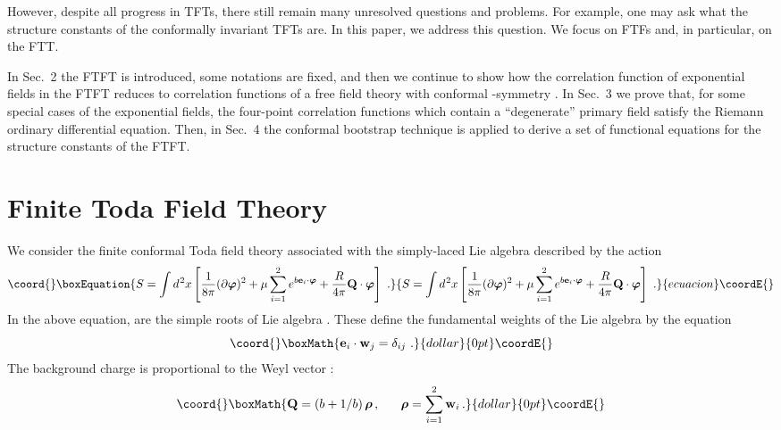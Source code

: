 \documentclass[a4paper,12pt]{article}
\providecommand{\bm}{\boldsymbol}
\begin{document}
However, despite all progress in TFTs, there still remain
many unresolved questions and problems. For example, one may ask
what the structure constants of the conformally invariant TFTs are.
In this paper, we address this question. We focus on FTFs and, in particular,
on the \coordHE{} FTT.

In Sec.~2 the
\coordHE{} FTFT is introduced, some notations are fixed, and then we
continue to show how the correlation function of exponential
fields in the FTFT reduces to correlation functions of a free
field theory with conformal \coordHE{}-symmetry \cite{Bilal,BS,FZ,LF}. 
In Sec.~3 we prove that, for some special cases of the
exponential fields, the four-point correlation functions which
contain  a ``degenerate'' primary field satisfy the Riemann
ordinary differential equation.
Then, in Sec.~4 the conformal bootstrap technique is applied to
derive a set of functional equations for the structure constants of the
\coordHE{} FTFT.

\section{\coordHE{} Finite Toda Field Theory}
We consider the finite conformal Toda field theory associated with
the simply-laced Lie algebra \coordHE{}  described by the action
\begin{equation}\coord{}\boxEquation{	
S=\int d^{\kern0.6pt 2}x
\left[\frac{1}{8\pi}(\partial{\bm\varphi})^2+\mu
\sum^2_{i=1} e^{b{\bf e}_i\cdot{\bm\varphi}}
+\frac{R}{4\pi}{\bf Q}\cdot{\bm\varphi}\right]~.
\label{eq:1}
}{	
S=\int d^{\kern0.6pt 2}x
\left[\frac{1}{8\pi}(\partial{\bm\varphi})^2+\mu
\sum^2_{i=1} e^{b{\bf e}_i\cdot{\bm\varphi}}
+\frac{R}{4\pi}{\bf Q}\cdot{\bm\varphi}\right]~.
}{ecuacion}\coordE{}\end{equation}
In the above equation,  \coordHE{}  \coordHE{} are the simple roots of Lie algebra
\coordHE{}. These define the fundamental weights
\coordHE{} of the Lie algebra by the equation
$$\coord{}\boxMath{
 {\bf e}_i \cdot {\bf w}_j=\delta_{ij}~.
}{dollar}{0pt}\coordE{}$$
The background charge \coordHE{} is proportional to the Weyl vector \myHighlight{${\bm\rho}$}\coordHE{}:
$$\coord{}\boxMath{
{\bf Q}=(b+1/b)\, {\bm\rho}\, ,~~~~~
{\bm\rho}=\displaystyle\sum^2_{i=1} {\bf w}_i\, .
}{dollar}{0pt}\coordE{}$$
\end{document}
